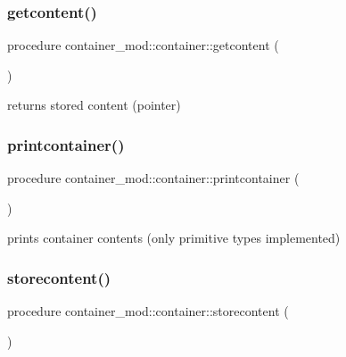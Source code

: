 \subsubsection{\texorpdfstring{getcontent()}{getcontent()}}
{\footnotesize\ttfamily procedure container\+\_\+mod\+::container\+::getcontent (\begin{DoxyParamCaption}{ }\end{DoxyParamCaption})\hspace{0.3cm}{\ttfamily [private]}}



returns stored content (pointer) 

\mbox{\label{structcontainer__mod_1_1container_ac62ed00e4c79b7c758a5efbc9cc1909a}} 
\subsubsection{\texorpdfstring{printcontainer()}{printcontainer()}}
{\footnotesize\ttfamily procedure container\+\_\+mod\+::container\+::printcontainer (\begin{DoxyParamCaption}{ }\end{DoxyParamCaption})\hspace{0.3cm}{\ttfamily [private]}}



prints container contents (only primitive types implemented) 

\mbox{\label{structcontainer__mod_1_1container_a15e46e6f457bb49604ccf191780f6638}} 
\subsubsection{\texorpdfstring{storecontent()}{storecontent()}}
{\footnotesize\ttfamily procedure container\+\_\+mod\+::container\+::storecontent (\begin{DoxyParamCaption}{ }\end{DoxyParamCaption})\hspace{0.3cm}{\ttfamily [private]}}



